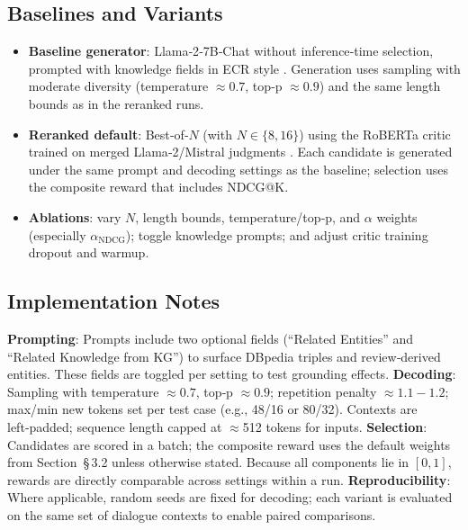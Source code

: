 \documentclass[12pt]{article}
\begin{document}
  \subsection{Baselines and Variants}
  \begin{itemize}[leftmargin=*]
    \item \textbf{Baseline generator}: Llama‑2‑7B‑Chat without inference‑time selection, prompted with knowledge fields in ECR style \citep{meta2023llama2,zhang2024ecr,chen2020kbrd,zhou2020kgsf}. Generation uses sampling with moderate diversity (temperature \(\approx 0.7\), top‑p \(\approx 0.9\)) and the same length bounds as in the reranked runs.
    \item \textbf{Reranked default}: Best‑of‑$N$ (with $N\in\{8,16\}$) using the RoBERTa critic trained on merged Llama‑2/Mistral judgments \citep{meta2023llama2,mistral2023}. Each candidate is generated under the same prompt and decoding settings as the baseline; selection uses the composite reward that includes NDCG@K.
    \item \textbf{Ablations}: vary $N$, length bounds, temperature/top‑p, and $\alpha$ weights (especially $\alpha_{\mathrm{NDCG}}$); toggle knowledge prompts; and adjust critic training dropout and warmup.
  \end{itemize}
  
  \subsection{Implementation Notes}
    \textbf{Prompting}: Prompts include two optional fields (``Related Entities'' and ``Related Knowledge from KG'') to surface DBpedia triples \citep{dbpedia_wikipedia} and review‑derived entities. These fields are toggled per setting to test grounding effects.
    \newline
    \textbf{Decoding}: Sampling with temperature \(\approx 0.7\), top‑p \(\approx 0.9\); repetition penalty \(\approx 1.1{-}1.2\); max/min new tokens set per test case (e.g., 48/16 or 80/32). Contexts are left‑padded; sequence length capped at \(\approx\)512 tokens for inputs.
    \newline
    \textbf{Selection}: Candidates are scored in a batch; the composite reward uses the default weights from Section~\S\,3.2 unless otherwise stated. Because all components lie in \([0,1]\), rewards are directly comparable across settings within a run.
    \newline
    \textbf{Reproducibility}: Where applicable, random seeds are fixed for decoding; each variant is evaluated on the same set of dialogue contexts to enable paired comparisons.
  
\end{document}
